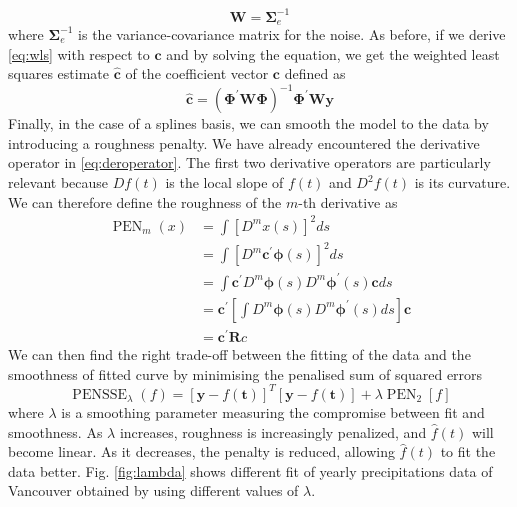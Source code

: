 \begin{equation}
    \mathbf{W}=\bm{\Sigma}_e^{-1}
\end{equation}
where $\bm{\Sigma}_e^{-1}$ is the variance-covariance matrix for the noise. As before, if we derive \ref{eq:wls} with respect to $\mathbf{c}$ and by solving the equation, we get the weighted least squares estimate $\hat{\mathbf{c}}$ of the coefficient vector $\mathbf{c}$ defined as
\begin{equation}
    \hat{\mathbf{c}}=\left(\bm{\Phi}^{\prime} \mathbf{W} \bm{\Phi}\right)^{-1} \bm{\Phi}^{\prime} \mathbf{W} \mathbf{y}
\end{equation}
Finally, in the case of a splines basis, we can smooth the model to the data by introducing a roughness penalty. We have already encountered the derivative operator in \ref{eq:deroperator}. The first two derivative operators are particularly relevant because  $Df(t)$ is the local slope of $f(t)$ and $D^2f(t)$ is its curvature. We can therefore define the roughness of the $m$-th derivative as
\begin{equation}
    \label{eq:roughness}
    \begin{aligned}
\operatorname{PEN}_m(x) & =\int\left[D^m x(s)\right]^2 d s \\
& =\int\left[D^m \mathbf{c}^{\prime} \boldsymbol{\phi}(s)\right]^2 d s \\
& =\int \mathbf{c}^{\prime} D^m \boldsymbol{\phi}(s) D^m \boldsymbol{\phi}^{\prime}(s) \mathbf{c} d s \\
& =\mathbf{c}^{\prime}\left[\int D^m \boldsymbol{\phi}(s) D^m \boldsymbol{\phi}^{\prime}(s) d s\right] \mathbf{c} \\
& =\mathbf{c}^{\prime} \mathbf{R} c
\end{aligned}
\end{equation}
We can then find the right trade-off between the fitting of the data and the smoothness of fitted curve by minimising the penalised sum of squared errors
\begin{equation}
    \label{eq:pensse}
    \operatorname{PENSSE}_\lambda(f)=[\mathbf{y}-f(\mathbf{t})]^T[\mathbf{y}-f(\mathbf{t})]+\lambda \operatorname{PEN}_2[f]
\end{equation}
where $\lambda$ is a smoothing parameter measuring the compromise between fit and smoothness. As $\lambda$ increases, roughness is increasingly penalized, and $\hat{f}(t)$ will become linear. As it decreases, the penalty is reduced, allowing $\hat{f}(t)$ to fit the data better. Fig. \ref{fig:lambda} shows different fit of yearly precipitations data of Vancouver obtained by using different values of $\lambda$.
